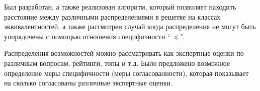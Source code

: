 \documentclass[a4paper, 14pt]{extarticle}
\begin{document}
Был разработан, а также реализован алгоритм, который позволяет находить расстояние между различными распределениями в решетке на классах эквивалентностей, а также рассмотрен случай когда распределения не могут быть упорядочены с помощью отношения специфичности ``$\preceq$''.

Распределения возможностей можно рассматривать как экспертные оценки по различным вопросам, рейтинги, топы и т.д. Было предложено возможное определение меры специфичности (меры согласованности), которая показывает на сколько согласованы различные экспертные оценки.


\newpage
\printbibliography[heading=bibintoc]
\end{document}
